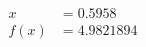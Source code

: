 \documentclass[preview]{standalone}
\begin{document}
\begin{align*}
x &= 0.5958\\f(x) &= 4.9821894
\end{align*}
\end{document}
